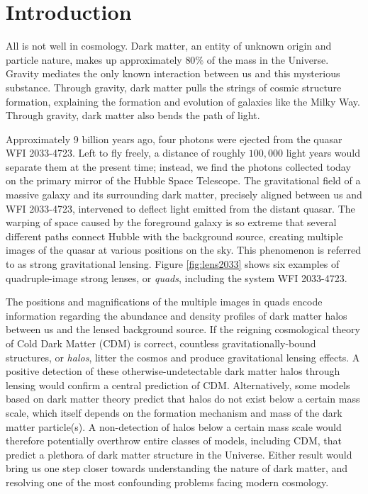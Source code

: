 
%
%

\chapter{Introduction}

\indent All is not well in cosmology. Dark matter, an entity of unknown origin and particle nature, makes up approximately $80\%$ of the mass in the Universe. Gravity mediates the only known interaction between us and this mysterious substance. Through gravity, dark matter pulls the strings of cosmic structure formation, explaining the formation and evolution of galaxies like the Milky Way. Through gravity, dark matter also bends the path of light. 

Approximately 9 billion years ago, four photons were ejected from the quasar WFI 2033-4723. Left to fly freely, a distance of roughly $100,000$ light years would separate them at the present time; instead, we find the photons collected today on the primary mirror of the Hubble Space Telescope. The gravitational field of a massive galaxy and its surrounding dark matter, precisely aligned between us and WFI 2033-4723, intervened to deflect light emitted from the distant quasar. The warping of space caused by the foreground galaxy is so extreme that several different paths connect Hubble with the background source, creating multiple images of the quasar at various positions on the sky. This phenomenon is referred to as strong gravitational lensing. Figure \ref{fig:lens2033} shows six examples of quadruple-image strong lenses, or \textit{quads}, including the system WFI 2033-4723.

The positions and magnifications of the multiple images in quads encode information regarding the abundance and density profiles of dark matter halos between us and the lensed background source. If the reigning cosmological theory of Cold Dark Matter (CDM) is correct, countless gravitationally-bound structures, or \textit{halos}, litter the cosmos and produce gravitational lensing effects. A positive detection of these otherwise-undetectable dark matter halos through lensing would confirm a central prediction of CDM. Alternatively, some models based on dark matter theory predict that halos do not exist below a certain mass scale, which itself depends on the formation mechanism and mass of the dark matter particle(s). A non-detection of halos below a certain mass scale would therefore potentially overthrow entire classes of models, including CDM, that predict a plethora of dark matter structure in the Universe. Either result would bring us one step closer towards understanding the nature of dark matter, and resolving one of the most confounding problems facing modern cosmology. 

